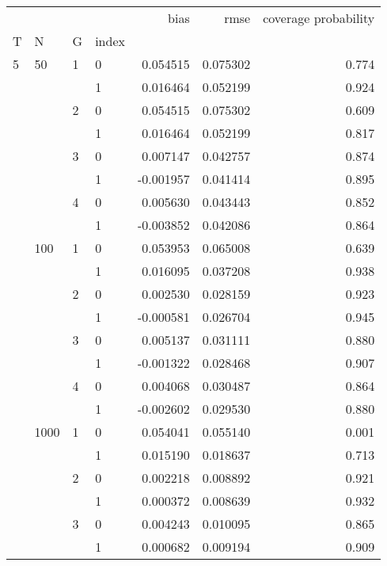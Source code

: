 \begin{tabular}{llllrrr}
\toprule
   &      &   &   &      bias &      rmse &  coverage probability \\
T & N & G & index &           &           &                       \\
\midrule
5  & 50   & 1 & 0 &  0.054515 &  0.075302 &                 0.774 \\
   &      &   & 1 &  0.016464 &  0.052199 &                 0.924 \\
   &      & 2 & 0 &  0.054515 &  0.075302 &                 0.609 \\
   &      &   & 1 &  0.016464 &  0.052199 &                 0.817 \\
   &      & 3 & 0 &  0.007147 &  0.042757 &                 0.874 \\
   &      &   & 1 & -0.001957 &  0.041414 &                 0.895 \\
   &      & 4 & 0 &  0.005630 &  0.043443 &                 0.852 \\
   &      &   & 1 & -0.003852 &  0.042086 &                 0.864 \\
   & 100  & 1 & 0 &  0.053953 &  0.065008 &                 0.639 \\
   &      &   & 1 &  0.016095 &  0.037208 &                 0.938 \\
   &      & 2 & 0 &  0.002530 &  0.028159 &                 0.923 \\
   &      &   & 1 & -0.000581 &  0.026704 &                 0.945 \\
   &      & 3 & 0 &  0.005137 &  0.031111 &                 0.880 \\
   &      &   & 1 & -0.001322 &  0.028468 &                 0.907 \\
   &      & 4 & 0 &  0.004068 &  0.030487 &                 0.864 \\
   &      &   & 1 & -0.002602 &  0.029530 &                 0.880 \\
   & 1000 & 1 & 0 &  0.054041 &  0.055140 &                 0.001 \\
   &      &   & 1 &  0.015190 &  0.018637 &                 0.713 \\
   &      & 2 & 0 &  0.002218 &  0.008892 &                 0.921 \\
   &      &   & 1 &  0.000372 &  0.008639 &                 0.932 \\
   &      & 3 & 0 &  0.004243 &  0.010095 &                 0.865 \\
   &      &   & 1 &  0.000682 &  0.009194 &                 0.909 \\

\end{tabular}
